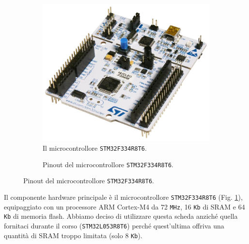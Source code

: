 \documentclass[a4paper]{article}
\begin{document}
\begin{figure}[h!t]
    \begin{subfigure}[b]{0.45\textwidth}
        \begin{center}
            \includegraphics[scale=0.15]{figures/stm32f334.jpg}
        \end{center}
        \caption{Il microcontrollore \texttt{STM32F334R8T6}.}
        \label{fig:stm32f334}
    \end{subfigure}
    \hfill
    \begin{subfigure}[b]{0.45\textwidth}
        \begin{center}
            \begin{tikzpicture}[x=0.015cm, y=0.015cm, scale=0.50, transform shape]
                
            \end{tikzpicture}
        \end{center}
        \caption{Pinout del microcontrollore \texttt{STM32F334R8T6}.}
        \label{fig:pinout_stm32}
    \end{subfigure}
\end{figure}

Il componente hardware principale è il microcontrollore \texttt{STM32F334R8T6}
(Fig. \ref{fig:stm32f334}), equipaggiato con un processore ARM Cortex-M4
da 72 \texttt{MHz}, 16 \texttt{Kb} di SRAM e 64 \texttt{Kb}
di memoria flash. Abbiamo deciso di utilizzare questa scheda anziché
quella fornitaci durante il corso (\texttt{STM32L053R8T6}) perché quest'ultima
offriva una quantità di SRAM troppo limitata (solo 8 \texttt{Kb}).
\end{document}
